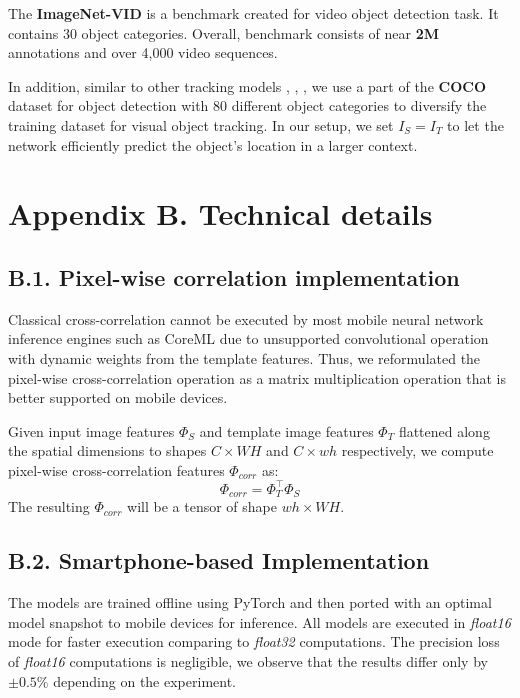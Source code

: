 \documentclass[runningheads]{llncs}
\begin{document}
The \textbf{ImageNet-VID} \cite{ImageNet} is a benchmark created for video object detection task. It contains 30 object categories. 
Overall, benchmark consists of near \textbf{2M} annotations and over 4,000 video sequences.

In addition, similar to other tracking models \cite{SiamFC}, \cite{DaSiamRPN}, \cite{Ocean}, we use a part of the \textbf{COCO} \cite{COCO} dataset for object detection with 80 different object categories to diversify the training dataset for visual object tracking. In our setup, we set $I_S = I_T$ to let the network efficiently predict the object's location in a larger context.

\section*{Appendix B. Technical details}
\subsection*{B.1. Pixel-wise correlation implementation}
Classical cross-correlation cannot be executed by most mobile neural network inference engines such as CoreML \cite{coreml} due to unsupported convolutional operation with dynamic weights from the template features. 
Thus, we reformulated the pixel-wise cross-correlation operation as a matrix multiplication operation that is better supported on mobile devices. 

Given input image features $\Phi_{S}$ and template image features $\Phi_{T}$ flattened along the spatial dimensions to shapes $C \times WH$ and $C \times wh$ respectively, we compute pixel-wise cross-correlation features $\Phi_{corr}$ as:
\begin{equation}
\Phi_{corr} = \Phi_{T}^{\top} \Phi_{S}
\end{equation}
The resulting $\Phi_{corr}$ will be a tensor of shape $wh \times WH$.

\subsection*{B.2. Smartphone-based Implementation} The models are trained offline using PyTorch \cite{pytorch} and then ported with an optimal model snapshot to mobile devices for inference. All models are executed in \textit{float16} mode for faster execution comparing to \textit{float32} computations. The precision loss of \textit{float16} computations is negligible, we observe that the results differ only by $\pm0.5\%$ depending on the experiment. 
\end{document}
